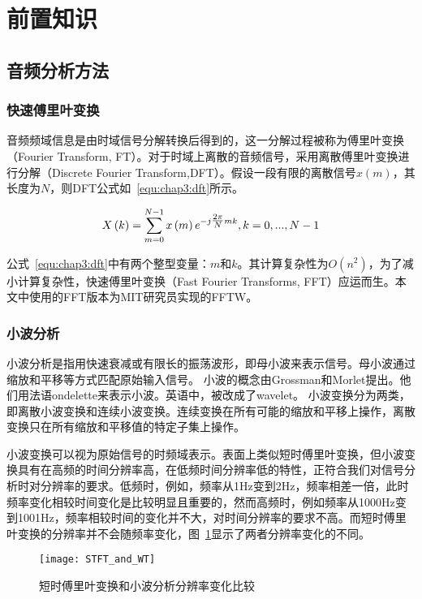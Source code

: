 \section{前置知识}

\subsection{音频分析方法}
\subsubsection{快速傅里叶变换}
音频频域信息是由时域信号分解转换后得到的，这一分解过程被称为傅里叶变换（Fourier Transform, FT）。对于时域上离散的音频信号，采用离散傅里叶变换进行分解（Discrete Fourier Transform,DFT）。假设一段有限的离散信号$x(m)$，其长度为$N$，则DFT公式如~\ref{equ:chap3:dft}所示。

\begin{equation}
\label{equ:chap3:dft}
X\left( k \right) = \sum\limits_{m = 0}^{N - 1} {x\left( m \right){e^{ - j{\textstyle{{2\pi } \over N}}mk}},k = 0,...,N - 1}
\end{equation}

公式~\ref{equ:chap3:dft}中有两个整型变量：$m$和$k$。其计算复杂性为$O\left( n^2 \right)$，为了减小计算复杂性，快速傅里叶变换（Fast Fourier Transforms, FFT）应运而生。本文中使用的FFT版本为MIT研究员实现的FFTW。


\subsubsection{小波分析}
小波分析是指用快速衰减或有限长的振荡波形，即母小波来表示信号。母小波通过缩放和平移等方式匹配原始输入信号。
小波的概念由Grossman和Morlet提出。他们用法语ondelette来表示小波。英语中，被改成了wavelet。
小波变换分为两类，即离散小波变换和连续小波变换。连续变换在所有可能的缩放和平移上操作，离散变换只在所有缩放和平移值的特定子集上操作。

小波变换可以视为原始信号的时频域表示。表面上类似短时傅里叶变换，但小波变换具有在高频的时间分辨率高，在低频时间分辨率低的特性，正符合我们对信号分析时对分辨率的要求。低频时，例如，频率从1Hz变到2Hz，频率相差一倍，此时频率变化相较时间变化是比较明显且重要的，然而高频时，例如频率从1000Hz变到1001Hz，频率相较时间的变化并不大，对时间分辨率的要求不高。而短时傅里叶变换的分辨率并不会随频率变化，图~\ref{fig:STFT_and_WT}显示了两者分辨率变化的不同。

\begin{figure}[htbp] %
  \centering
  \texttt{[image: STFT\_and\_WT]}
  \caption{短时傅里叶变换和小波分析分辨率变化比较}
  \label{fig:STFT_and_WT}
\end{figure}


